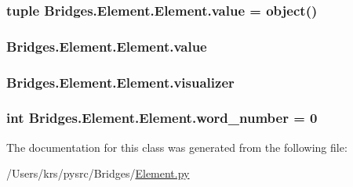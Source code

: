 \subsubsection[{value}]{\setlength{\rightskip}{0pt plus 5cm}tuple Bridges.\+Element.\+Element.\+value = object()\hspace{0.3cm}{\ttfamily [static]}}\label{class_bridges_1_1_element_1_1_element_ae186801f92c6056c2bbec2dae153c228}
\hypertarget{class_bridges_1_1_element_1_1_element_adfe068cd72057bd5a45f71fdee2a6a91}{}
\subsubsection[{value}]{\setlength{\rightskip}{0pt plus 5cm}Bridges.\+Element.\+Element.\+value}\label{class_bridges_1_1_element_1_1_element_adfe068cd72057bd5a45f71fdee2a6a91}
\hypertarget{class_bridges_1_1_element_1_1_element_a754c5ca67518e3c9ff6b6e7882ed05c6}{}
\subsubsection[{visualizer}]{\setlength{\rightskip}{0pt plus 5cm}Bridges.\+Element.\+Element.\+visualizer}\label{class_bridges_1_1_element_1_1_element_a754c5ca67518e3c9ff6b6e7882ed05c6}
\hypertarget{class_bridges_1_1_element_1_1_element_a857960f476b18de30baa18ae54877672}{}
\subsubsection[{word\+\_\+number}]{\setlength{\rightskip}{0pt plus 5cm}int Bridges.\+Element.\+Element.\+word\+\_\+number = 0\hspace{0.3cm}{\ttfamily [static]}}\label{class_bridges_1_1_element_1_1_element_a857960f476b18de30baa18ae54877672}


The documentation for this class was generated from the following file\+:\begin{DoxyCompactItemize}
\item 
/\+Users/krs/pysrc/\+Bridges/\hyperlink{_element_8py}{Element.\+py}\end{DoxyCompactItemize}
